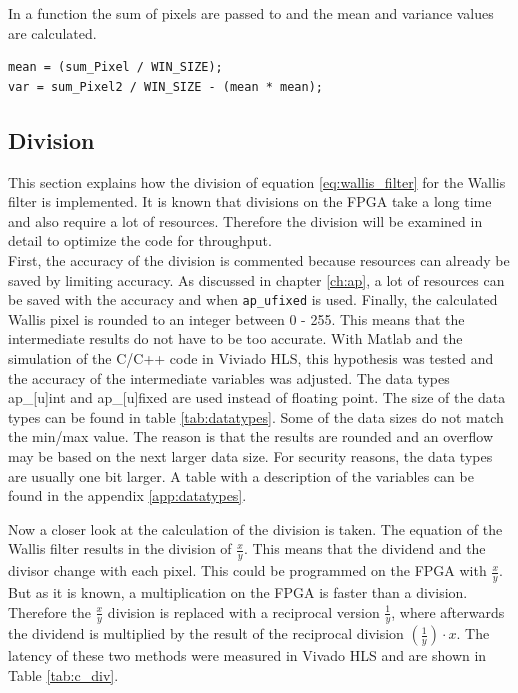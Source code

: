 In a function the sum of pixels are passed to and the mean and variance values
are calculated. \\
\begin{minipage}{\textwidth}
\begin{lstlisting}[style=CStyle, caption=Calculation of mean and variance
values, label=lst:mean_var]
mean = (sum_Pixel / WIN_SIZE);
var = sum_Pixel2 / WIN_SIZE - (mean * mean);
\end{lstlisting}
\end{minipage}


\subsection{Division} \label{ch:hls:div}
This section explains how the division of equation \ref{eq:wallis_filter} for
the Wallis filter is implemented. It is known that divisions on the FPGA take a long time and also require a lot of resources. Therefore the division will be examined in detail to optimize the code for throughput. \\
First, the accuracy of the division is commented because resources can already be
saved by limiting accuracy.
As discussed in chapter \ref{ch:ap}, a lot
of resources can be saved with the accuracy and when \texttt{ap\_ufixed} is used.
Finally, the calculated Wallis pixel is rounded to an integer between 0 - 255.
This means that the intermediate results do not have to be too accurate. With
Matlab and the simulation of the C/C++ code in Viviado HLS, this hypothesis was
tested and the accuracy of the intermediate variables was adjusted. The data types
ap\_[u]int and
ap\_[u]fixed are used instead of floating point. The size of the data types can
be
found in table \ref{tab:datatypes}. Some of the data sizes do not match the
min/max value. The reason is that the results are rounded and an overflow may be
based on the next larger data size. For security reasons, the data types are
usually one bit larger. A table with a description of the variables can be found
in the appendix \ref{app:datatypes}.

\clearpage
Now a closer look at the calculation of the division is taken. The equation
of the Wallis filter results in the division of $\frac{x}{y}$. This means that
the dividend and the divisor change with each pixel. This could be programmed on
the FPGA with $\frac{x}{y}$. But as it is known, a multiplication on the FPGA is
faster than a division. Therefore the $\frac{x}{y}$ division is replaced with a
reciprocal version $\frac{1}{y}$, where afterwards the dividend is multiplied by the result of the reciprocal division $(\frac{1}{y}) \cdot x$. The latency of these two methods were measured in Vivado HLS and are shown in Table \ref{tab:c_div}. \\


